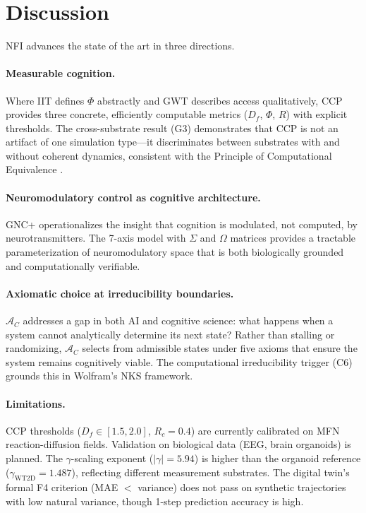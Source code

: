 \documentclass[10pt,letterpaper]{article}
\begin{document}
\section{Discussion}

NFI advances the state of the art in three directions.

\paragraph{Measurable cognition.}
Where IIT defines $\Phi$ abstractly and GWT describes access
qualitatively, CCP provides three concrete, efficiently computable
metrics ($D_f$, $\Phi$, $R$) with explicit thresholds. The cross-substrate
result (G3) demonstrates that CCP is not an artifact of one simulation
type---it discriminates between substrates with and without coherent
dynamics, consistent with the Principle of Computational
Equivalence \citep{wolfram2002}.

\paragraph{Neuromodulatory control as cognitive architecture.}
GNC+ operationalizes the insight that cognition is modulated, not
computed, by neurotransmitters. The 7-axis model with $\Sigma$ and
$\Omega$ matrices provides a tractable parameterization of
neuromodulatory space that is both biologically grounded
\citep{schultz1997, dayan2006} and computationally verifiable.

\paragraph{Axiomatic choice at irreducibility boundaries.}
$\mathcal{A}_C$ addresses a gap in both AI and cognitive science:
what happens when a system cannot analytically determine its next
state? Rather than stalling or randomizing, $\mathcal{A}_C$ selects
from admissible states under five axioms that ensure the system
remains cognitively viable. The computational irreducibility trigger
(C6) grounds this in Wolfram's NKS framework.

\paragraph{Limitations.}
CCP thresholds ($D_f \in [1.5, 2.0]$, $R_c = 0.4$) are currently
calibrated on MFN reaction-diffusion fields. Validation on biological
data (EEG, brain organoids) is planned. The $\gamma$-scaling
exponent ($|\gamma| = 5.94$) is higher than the organoid reference
($\gamma_{\text{WT2D}} = 1.487$), reflecting different measurement
substrates. The digital twin's formal F4 criterion (MAE $<$ variance)
does not pass on synthetic trajectories with low natural variance,
though 1-step prediction accuracy is high.
\end{document}
